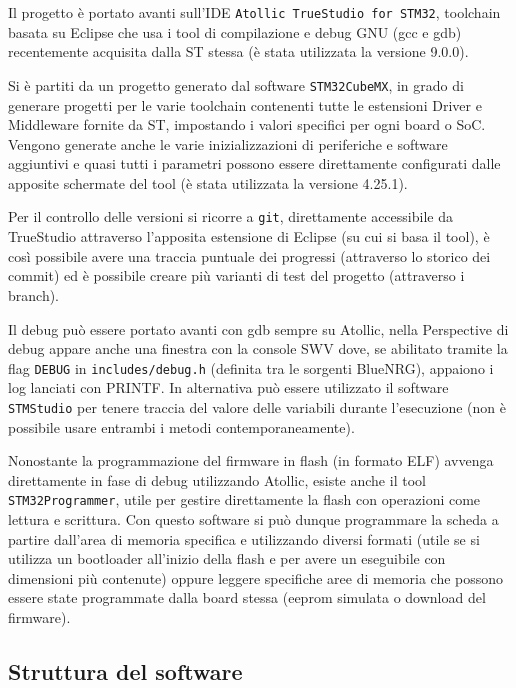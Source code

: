 Il progetto \`e portato avanti sull'IDE \texttt{Atollic TrueStudio for STM32}, toolchain basata su Eclipse che usa i tool di compilazione e debug GNU (gcc e gdb) recentemente acquisita dalla ST stessa (\`e stata utilizzata la versione 9.0.0).

Si \`e partiti da un progetto generato dal software \texttt{STM32CubeMX}, in grado di generare progetti per le varie toolchain contenenti tutte le estensioni Driver e Middleware fornite da ST, impostando i valori specifici per ogni board o SoC. Vengono generate anche le varie inizializzazioni di periferiche e software aggiuntivi e quasi tutti i parametri possono essere direttamente configurati dalle apposite schermate del tool (\`e stata utilizzata la versione 4.25.1).

Per il controllo delle versioni si ricorre a \texttt{git}, direttamente accessibile da TrueStudio attraverso l'apposita estensione di Eclipse (su cui si basa il tool), \`e cos\`i possibile avere una traccia puntuale dei progressi (attraverso lo storico dei commit) ed \`e possibile creare pi\`u varianti di test del progetto (attraverso i branch).

Il debug pu\`o essere portato avanti con gdb sempre su Atollic, nella Perspective di debug appare anche una finestra con la console SWV dove, se abilitato tramite la flag \texttt{DEBUG} in \texttt{includes/debug.h} (definita tra le sorgenti BlueNRG), appaiono i log lanciati con PRINTF. In alternativa pu\`o essere utilizzato il software \texttt{STMStudio} per tenere traccia del valore delle variabili durante l'esecuzione (non \`e possibile usare entrambi i metodi contemporaneamente).

Nonostante la programmazione del firmware in flash (in formato ELF) avvenga direttamente in fase di debug utilizzando Atollic, esiste anche il tool \texttt{STM32Programmer}, utile per gestire direttamente la flash con operazioni come lettura e scrittura. Con questo software si pu\`o dunque programmare la scheda a partire dall'area di memoria specifica e utilizzando diversi formati (utile se si utilizza un bootloader all'inizio della flash e per avere un eseguibile con dimensioni pi\`u contenute) oppure leggere specifiche aree di memoria che possono essere state programmate dalla board stessa (eeprom simulata o download del firmware).

\subsection{Struttura del software}

